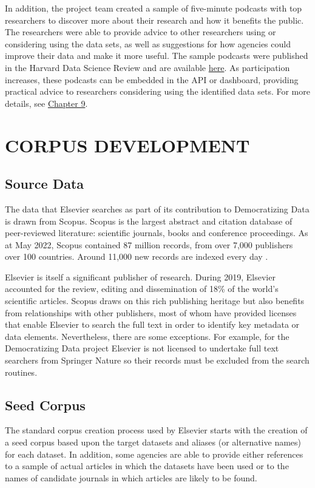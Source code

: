 \documentclass[titlepage, 11pt]{article}
\begin{document}
{In addition, the project team created a sample of five-minute podcasts with top researchers to discover more about their research and how it benefits the public.  The researchers were able to provide advice to other researchers using or considering using the data sets, as well as suggestions for how agencies could improve their data and make it more useful.  The sample podcasts were published in the Harvard Data Science Review and are available \href{https://hdsr.mitpress.mit.edu/pub/gnf4pmig/release/3}{here}. As participation increases, these podcasts can be embedded in the API or dashboard, providing practical advice to researchers considering using the identified data sets.  For more details, see \hyperref[sec:Chapter9]{Chapter 9}.

\section{CORPUS DEVELOPMENT}
\label{sec:Chapter4}
\subsection{Source Data}
The data that Elsevier searches as part of its contribution to Democratizing Data is drawn from Scopus. Scopus is the largest abstract and citation database of peer-reviewed literature: scientific journals, books and conference proceedings. As at May 2022, Scopus contained 87 million records, from over 7,000 publishers over 100 countries. Around 11,000 new records are indexed every day\cite{source3,source4,source5} . 

Elsevier is itself a significant publisher of research. During 2019, Elsevier accounted for the review, editing and dissemination of 18\% of the world's scientific articles. Scopus draws on this rich publishing heritage but also benefits from relationships with other publishers, most of whom have provided licenses that enable Elsevier to search the full text in order to identify key metadata or data elements. Nevertheless, there are some exceptions. For example, for the Democratizing Data project Elsevier is not licensed to undertake full text searchers from Springer Nature so their records must be excluded from the search routines.

\subsection{Seed Corpus}
The standard corpus creation process used by Elsevier starts with the creation of a seed corpus based upon the target datasets and aliases (or alternative names) for each dataset. In addition, some agencies are able to provide either references to a sample of actual articles in which the datasets have been used or to the names of candidate journals in which articles are likely to be found.

}
\end{document}
